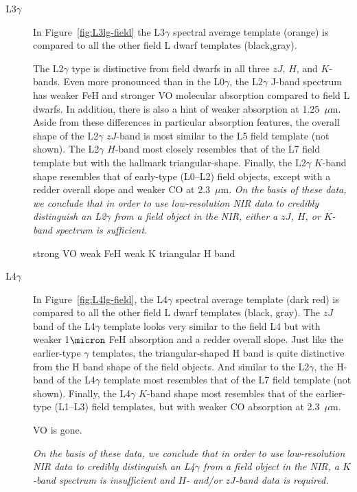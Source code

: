 \documentclass[12pt,preprint]{aastex}
\begin{document}
\begin{description}
\item[L3$\gamma$]{
In Figure~\ref{fig:L3lg-field} the L3$\gamma$ spectral average template (orange) is compared to all the other field L dwarf templates (black,gray). 

The L2$\gamma$ type is distinctive from field dwarfs in all three $zJ$, $H$, and $K$-bands. 
Even more pronounced than in the L0$\gamma$, the L2$\gamma$ J-band spectrum has weaker FeH and stronger VO molecular absorption compared to field L dwarfs. 
In addition, there is also a hint of weaker  absorption at 1.25~$\mu$m. Aside from these differences in particular absorption features, the overall shape of the L2$\gamma$ $zJ$-band is most similar to the L5 field template (not shown).
The L2$\gamma$ $H$-band most closely resembles that of the L7 field template but with the hallmark  triangular-shape. 
Finally, the L2$\gamma$ $K$-band shape resembles that of early-type (L0--L2) field objects, except with a redder overall slope and weaker CO at 2.3~$\mu$m. 
\emph{On the basis of these data, we conclude that in order to use low-resolution NIR data to credibly distinguish an L2$\gamma$ from a field object in the NIR, either a $zJ$, $H$, or $K$-band spectrum is sufficient.}

strong VO
weak FeH
weak K
triangular H band
}

\item[L4$\gamma$]{
In Figure~\ref{fig:L4lg-field}, the L4$\gamma$ spectral average template (dark red) is compared to all the other field L dwarf templates (black, gray). 
The $zJ$ band of the L4$\gamma$ template looks very similar to the field L4 but with weaker 1$\micron$ FeH absorption and a redder overall slope. 
Just like the earlier-type $\gamma$ templates, the triangular-shaped H band is quite distinctive from the H band shape of the field objects. And similar to the L2$\gamma$, the H-band of the L4$\gamma$ template most resembles that of the L7 field template (not shown).
Finally, the L4$\gamma$ $K$-band shape most resembles that of the earlier-type (L1--L3) field templates, but with weaker CO absorption at 2.3~$\mu$m.

VO is gone.

\emph{On the basis of these data, we conclude that in order to use low-resolution NIR data to credibly distinguish an L4$\gamma$ from a field object in the NIR, a $K$-band spectrum is insufficient and $H$- and/or $zJ$-band data is required.}
}
\end{description}
\end{document}
